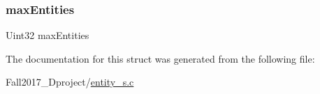 \subsubsection{\texorpdfstring{max\+Entities}{maxEntities}}
{\footnotesize\ttfamily Uint32 max\+Entities}



The documentation for this struct was generated from the following file\+:\begin{DoxyCompactItemize}
\item 
Fall2017\+\_\+Dproject/\hyperlink{entity__s_8c}{entity\+\_\+s.\+c}\end{DoxyCompactItemize}
